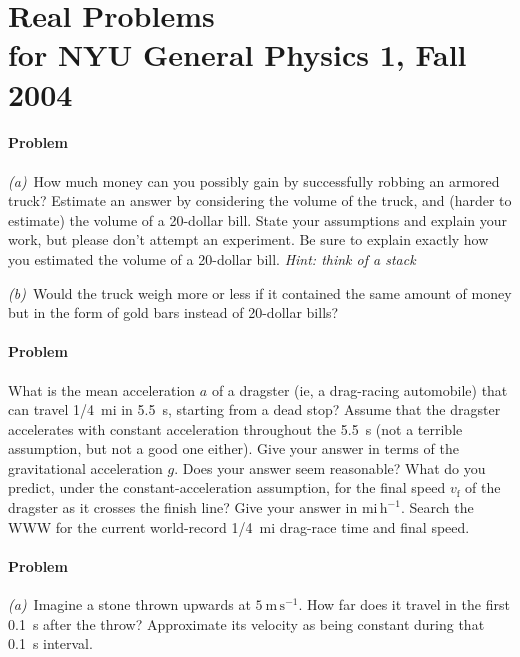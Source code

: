 \documentclass[12pt]{article}
\newcounter{problem}
\begin{document}
\section*{Real Problems \\
          for NYU General Physics 1, Fall 2004}

\paragraph{Problem~\theproblem}

\textsl{(a)}~How much money can you possibly gain by successfully
robbing an armored truck?  Estimate an answer by considering the
volume of the truck, and (harder to estimate) the volume of a
20-dollar bill.  State your assumptions and explain your work, but
please don't attempt an experiment.  Be sure to explain exactly how
you estimated the volume of a 20-dollar bill.  \emph{Hint: think of a
stack}

\textsl{(b)}~Would the truck weigh more or less if it contained the
same amount of money but in the form of gold bars instead of 20-dollar
bills?

\paragraph{Problem~\theproblem}

What is the mean acceleration $a$ of a dragster (ie, a drag-racing
automobile) that can travel 1/4~mi in 5.5~s, starting from a dead
stop?  Assume that the dragster accelerates with constant acceleration
throughout the 5.5~s (not a terrible assumption, but not a good one
either).  Give your answer in terms of the gravitational acceleration
$g$.  Does your answer seem reasonable?  What do you predict, under
the constant-acceleration assumption, for the final speed
$v_\mathrm{f}$ of the dragster as it crosses the finish line?  Give
your answer in $\mathrm{mi\,h^{-1}}$.  Search the WWW for the current
world-record 1/4~mi drag-race time and final speed.

\paragraph{Problem~\theproblem}

\textsl{(a)}~Imagine a stone thrown upwards at $5~\mathrm{m\,s^{-1}}$.
How far does it travel in the first 0.1~s after the throw?
Approximate its velocity as being constant during that 0.1~s interval.
\end{document}
